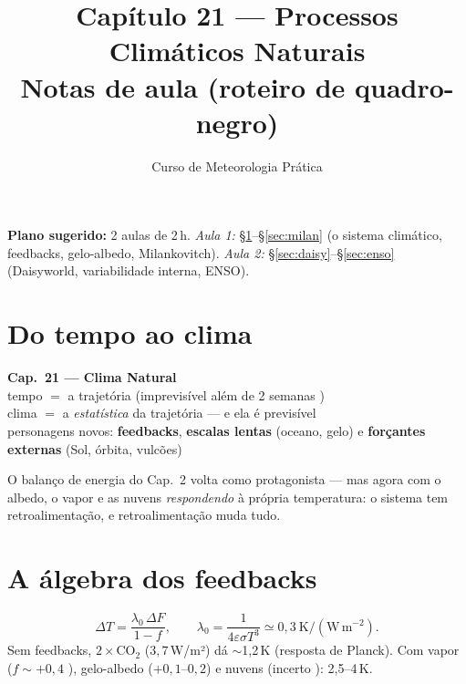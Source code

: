 \documentclass[11pt]{article}
\title{Capítulo 21 --- Processos Climáticos Naturais\\
{\large Notas de aula (roteiro de quadro-negro)}}
\author{Curso de Meteorologia Prática}
\date{}
\begin{document}
\maketitle
\thispagestyle{fancy}

\noindent\textbf{Plano sugerido:} 2 aulas de 2\,h.
\emph{Aula 1:} \S\ref{sec:sistema}--\S\ref{sec:milan} (o sistema
climático, feedbacks, gelo-albedo, Milankovitch).
\emph{Aula 2:} \S\ref{sec:daisy}--\S\ref{sec:enso} (Daisyworld,
variabilidade interna, ENSO).

\section{Do tempo ao clima}\label{sec:sistema}

\begin{noquadro}[abertura]
\textbf{Cap.~21 --- Clima Natural}\\[2pt]
tempo $=$ a trajetória (imprevisível além de 2 semanas
)\\
clima $=$ a \emph{estatística} da trajetória — e ela é previsível\\[2pt]
personagens novos: \textbf{feedbacks}, \textbf{escalas lentas}
(oceano, gelo) e \textbf{forçantes externas} (Sol, órbita, vulcões)
\end{noquadro}

O balanço de energia do Cap.~2  volta como
protagonista — mas agora com o albedo, o vapor e as nuvens
\emph{respondendo} à própria temperatura: o sistema tem
retroalimentação, e retroalimentação muda tudo.

\section{A álgebra dos feedbacks}\label{sec:feed}


\begin{formadif}
\[ \Delta T = \frac{\lambda_0\,\Delta F}{1 - f},\qquad
\lambda_0 = \frac{1}{4\varepsilon\sigma T^3} \simeq
0{,}3\ \mathrm{K/(W\,m^{-2})}. \]
Sem feedbacks, $2\times$CO$_2$ ($3{,}7$\,W/m²) dá $\sim$1,2\,K
(resposta de Planck). Com vapor ($f\sim+0{,}4$
), gelo-albedo ($+0{,}1$--$0{,}2$) e
nuvens (incerto ): 2,5--4\,K.
\end{formadif}
\end{document}
